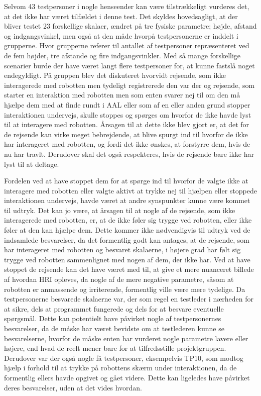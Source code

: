 Selvom 43 testpersoner i nogle henseender kan være tilstrækkeligt vurderes det, at det ikke har været tilfældet i denne test. Det skyldes hovedsagligt, at der bliver testet 23 forskellige skalaer, ændret på tre fysiske parametre; højde, afstand og indgangsvinkel, men også at den måde hvorpå testpersonerne er inddelt i grupperne. Hvor grupperne referer til antallet af testpersoner repræsenteret ved de fem højder, tre afstande og fire indgangsvinkler. Med så mange forskellige scenarier burde der have været langt flere testpersoner for, at kunne fastslå noget endegyldigt.\blankline
%
På gruppen blev det diskuteret hvorvidt rejsende, som ikke interagerede med robotten men tydeligt registrerede den var der og rejsende, som starter en interaktion med robotten men som enten svarer nej til om den må hjælpe dem med at finde rundt i AAL eller som af en eller anden grund stopper interaktionen undervejs, skulle stoppes og spørges om hvorfor de ikke havde lyst til at interagere med robotten. Årsagen til at dette ikke blev gjort er, at det for de rejsende kan virke meget bebrejdende, at blive spurgt ind til hvorfor de ikke har interageret med robotten, og fordi det ikke ønskes, at forstyrre dem, hvis de nu har travlt. Derudover skal det også respekteres, hvis de rejsende bare ikke har lyst til at deltage. 

Fordelen ved at have stoppet dem for at spørge ind til hvorfor de valgte ikke at interagere med robotten eller valgte aktivt at trykke nej til hjælpen eller stoppede interaktionen undervejs, havde været at andre synspunkter kunne være kommet til udtryk. Det kan jo være, at årsagen til at nogle af de rejsende, som ikke interagerede med robotten, er, at de ikke føler sig trygge ved robotten, eller ikke føler at den kan hjælpe dem. Dette kommer ikke nødvendigvis til udtryk ved de indsamlede besvarelser, da det formentlig godt kan antages, at de rejsende, som har interageret med robotten og besvaret skalaerne, i højere grad har følt sig trygge ved robotten sammenlignet med nogen af dem, der ikke har. Ved at have stoppet de rejsende kan det have været med til, at give et mere nuanceret billede af hvordan HRI opleves, da nogle af de mere negative parametre, såsom at robotten er anmassende og irriterende, formentlig ville være mere tydelige. \blankline
%
Da testpersonerne besvarede skalaerne var, der som regel en testleder i nærheden for at sikre, dels at programmet fungerede og dels for at besvare eventuelle spørgsmål. Dette kan potentielt have påvirket nogle af testpersonernes besvarelser, da de måske har været bevidste om at testlederen kunne se besvarelserne, hvorfor de måske enten har vurderet nogle parametre lavere eller højere, end hvad de reelt mener bare for at tilfredsstille projektgruppen. Derudover var der også nogle få testpersoner, eksempelvis TP10, som modtog hjælp i forhold til at trykke på robottens skærm under interaktionen, da de formentlig ellers havde opgivet og gået videre. Dette kan ligeledes have påvirket deres besvarelser, uden at det vides hvordan. 

